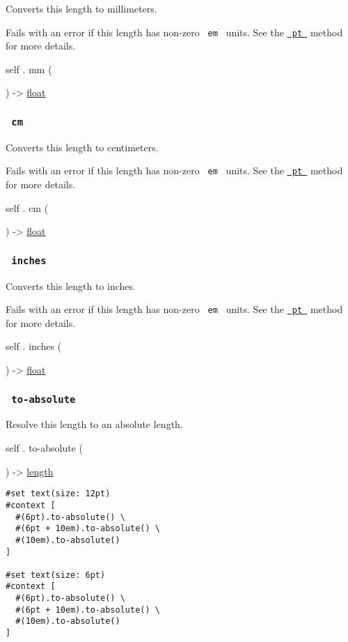 Converts this length to millimeters.

Fails with an error if this length has non-zero \texttt{\ em\ } units.
See the
\href{/docs/reference/layout/length/\#definitions-pt}{\texttt{\ pt\ }}
method for more details.

self { . } { mm } (

) -\textgreater{} \href{/docs/reference/foundations/float/}{float}

\subsubsection{\texorpdfstring{\texttt{\ cm\ }}{ cm }}\label{definitions-cm}

Converts this length to centimeters.

Fails with an error if this length has non-zero \texttt{\ em\ } units.
See the
\href{/docs/reference/layout/length/\#definitions-pt}{\texttt{\ pt\ }}
method for more details.

self { . } { cm } (

) -\textgreater{} \href{/docs/reference/foundations/float/}{float}

\subsubsection{\texorpdfstring{\texttt{\ inches\ }}{ inches }}\label{definitions-inches}

Converts this length to inches.

Fails with an error if this length has non-zero \texttt{\ em\ } units.
See the
\href{/docs/reference/layout/length/\#definitions-pt}{\texttt{\ pt\ }}
method for more details.

self { . } { inches } (

) -\textgreater{} \href{/docs/reference/foundations/float/}{float}

\subsubsection{\texorpdfstring{\texttt{\ to-absolute\ }}{ to-absolute }}\label{definitions-to-absolute}

Resolve this length to an absolute length.

self { . } { to-absolute } (

) -\textgreater{} \href{/docs/reference/layout/length/}{length}

\begin{verbatim}
#set text(size: 12pt)
#context [
  #(6pt).to-absolute() \
  #(6pt + 10em).to-absolute() \
  #(10em).to-absolute()
]

#set text(size: 6pt)
#context [
  #(6pt).to-absolute() \
  #(6pt + 10em).to-absolute() \
  #(10em).to-absolute()
]
\end{verbatim}

